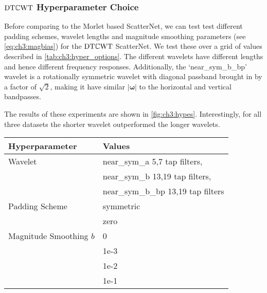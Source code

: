 \subsubsection{$\mathrm{DT}\mathbb{C}\mathrm{WT}$ Hyperparameter Choice}
Before comparing to the Morlet based ScatterNet, we can test 
test different padding schemes, wavelet lengths and magnitude smoothing parameters (see
\eqref{eq:ch3:magbias}) for the $\mathrm{DT}\mathbb{C}\mathrm{WT}$ ScatterNet. We test these over a grid of values described in
\autoref{tab:ch3:hyper_options}. The different wavelets have different lengths
and hence different frequency responses. Additionally, the `near\_sym\_b\_bp'
wavelet is a rotationally symmetric wavelet with diagonal passband brought in by
a factor of $\sqrt{2}$, making it have similar $|\bm{\omega}|$ to the horizontal
and vertical bandpasses.

The results of these experiments are shown in \autoref{fig:ch3:hypes}.
Interestingly, for all three datasets the shorter wavelet outperformed the
longer wavelets. 

\begin{table}[bt]
  \centering
  \label{tab:ch3:hyper_options}
  \begin{tabular}{l l}
    \toprule
    Hyperparameter & Values \\
    \midrule
    Wavelet & near\_sym\_a 5,7 tap filters, \\ 
            & near\_sym\_b 13,19 tap filters,\\
            & near\_sym\_b\_bp 13,19 tap filters \\\midrule
    Padding Scheme & symmetric \\
                   & zero  \\\midrule
    Magnitude Smoothing $b$ & 0\\
                            & 1e-3 \\
                            & 1e-2 \\
                            & 1e-1 
    \\\bottomrule
  \end{tabular}
\end{table}

